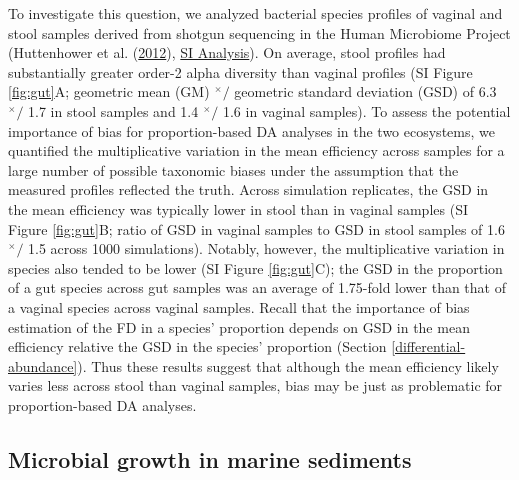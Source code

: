 \documentclass[
]{article}
\newcommand{\md}{^{\times}\!/}
\begin{document}
To investigate this question, we analyzed bacterial species profiles of vaginal and stool samples derived from shotgun sequencing in the Human Microbiome Project
(Huttenhower et al. (\protect\hyperlink{ref-huttenhower2012stru}{2012}), \href{https://mikemc.github.io/differential-abundance-theory/notebook/posts/2022-01-30-hmp-stool-vagina-comparison/}{SI Analysis}).
On average, stool profiles had substantially greater order-2 alpha diversity than vaginal profiles (SI Figure \ref{fig:gut}A; geometric mean (GM) \(\md\) geometric standard deviation (GSD) of 6.3 \(\md\) 1.7 in stool samples and 1.4 \(\md\) 1.6 in vaginal samples).
To assess the potential importance of bias for proportion-based DA analyses in the two ecosystems, we quantified the multiplicative variation in the mean efficiency across samples for a large number of possible taxonomic biases under the assumption that the measured profiles reflected the truth.
Across simulation replicates, the GSD in the mean efficiency was typically lower in stool than in vaginal samples (SI Figure \ref{fig:gut}B; ratio of GSD in vaginal samples to GSD in stool samples of 1.6 \(\md\) 1.5 across 1000 simulations).
Notably, however, the multiplicative variation in species also tended to be lower (SI Figure \ref{fig:gut}C); the GSD in the proportion of a gut species across gut samples was an average of 1.75-fold lower than that of a vaginal species across vaginal samples.
Recall that the importance of bias estimation of the FD in a species' proportion depends on GSD in the mean efficiency relative the GSD in the species' proportion (Section \ref{differential-abundance}).
Thus these results suggest that although the mean efficiency likely varies less across stool than vaginal samples, bias may be just as problematic for proportion-based DA analyses.

\hypertarget{microbial-growth-in-marine-sediments}{%
\subsection{Microbial growth in marine sediments}\label{microbial-growth-in-marine-sediments}}
\end{document}

